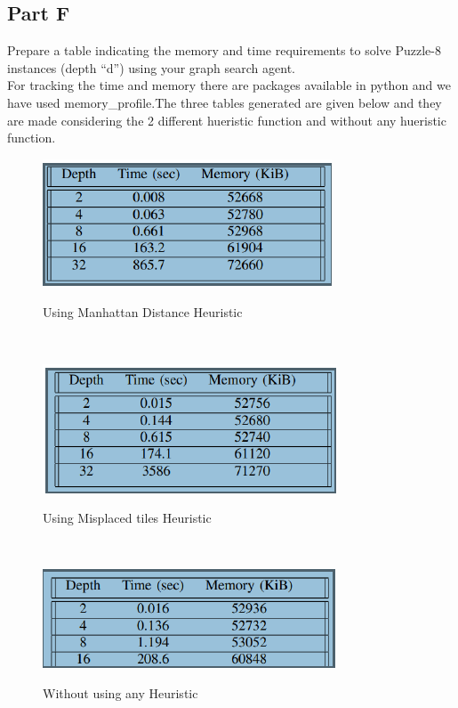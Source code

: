 \documentclass[conference]{IEEEtran}
\begin{document}
\subsection{Part F}
\newline
Prepare a table indicating the memory and time requirements to solve Puzzle-8 instances (depth “d”) using your graph search agent.
\\
For tracking the time and memory there are packages available in python and we have used memory\_profile.The three tables generated are given below and they are made considering the 2 different hueristic function and without any hueristic function.

\begin{figure}
\centerline{\includegraphics[scale=0.8]{usi.png}}
{        Using Manhattan Distance Heuristic}

\end{figure}
\\

\begin{figure}
\centerline{\includegraphics[scale=0.8]{mis.png}}
{        Using Misplaced tiles Heuristic}

\end{figure}
\\

\begin{figure}
\centerline{\includegraphics[scale=0.5]{wit.png}}
{        Without using any Heuristic}

\end{figure}
\end{document}

